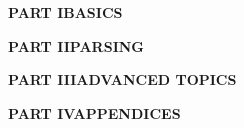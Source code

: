 \documentclass{article}
\def\part#1#2{\vfil\Huge\textbf{PART #1}\vfil\LARGE\textbf{#2}}
\begin{document}



\part{I}{BASICS}






\part{II}{PARSING}







\part{III}{ADVANCED TOPICS}





\part{IV}{APPENDICES}





\end{document}
